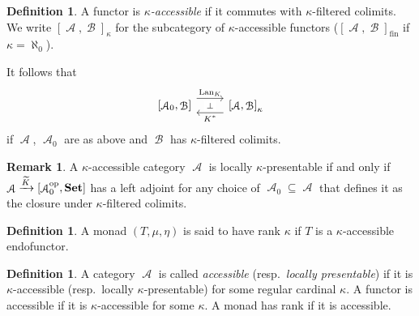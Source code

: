 \documentclass[a4paper,11pt,oneside,openany]{scrbook}
\newcommand{\catname}[1]{{\normalfont\textbf{#1}}}
\newcommand{\Set}{\catname{Set}}
\DeclareMathOperator{\op}{\text{op}}
\DeclareMathOperator{\A}{\mathcal{A}}
\DeclareMathOperator{\B}{\mathcal{B}}
\DeclareMathOperator{\Lan}{Lan}
\theoremstyle{definition}
\theoremstyle{definition}
\newtheorem{defn}[thm]{Definition} %
\newtheorem{rmk}[thm]{Remark}
\begin{document}
\begin{defn}
A functor is \emph{$\kappa$-accessible} if it commutes with $\kappa$-filtered colimits. We write $\left[\A,\B\right]_\kappa$ for the subcategory of $\kappa$-accessible functors ($\left[\A,\B\right]_{\text{fin}}$ if $\kappa=\aleph_0$).
\end{defn}
It follows that 
 \[
\begin{tikzcd}
\left[\A_0,\B\right]\ar[r, shift left=1.5ex,"\Lan_K",""{name=A, below}] & \left[\A,\B\right]_\kappa\ar[l, shift left=1.5ex, "K^*",""{name=B,above}] \ar[from=A, to=B, "\perp"description]
\end{tikzcd}
      \]
if $\A$, $\A_0$ are as above and $\B$ has $\kappa$-filtered colimits.
\begin{rmk}
    A $\kappa$-accessible category $\A$ is locally $\kappa$-presentable if and only if $\A\xrightarrow{\widetilde{K}}\left[\A_0^{\op},\Set\right]$ has a left adjoint for any choice of $\A_0\subseteq\A$ that defines it as the closure under $\kappa$-filtered colimits.
\end{rmk}
\begin{defn}
A monad $(T,\mu,\eta)$ is said to have rank $\kappa$ if $T$ is a $\kappa$-accessible endofunctor.
\end{defn}
\begin{defn}
A category $\A$ is called \emph{accessible} (resp.\ \emph{locally presentable}) if it is $\kappa$-accessible (resp.\ locally $\kappa$-presentable) for some regular cardinal $\kappa$. A functor is accessible if it is $\kappa$-accessible for some $\kappa$. A monad has rank if it is accessible.
\end{defn}
\end{document}

